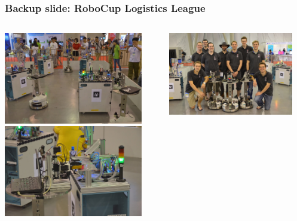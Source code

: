 \begin{frame}
  \frametitle{Backup slide: RoboCup Logistics League}
  \begin{columns}
  \begin{column}{0.5\textwidth}
  \center
  \includegraphics[width=0.9\textwidth]{images/DSC_6148}\\  
  \includegraphics[width=0.9\textwidth]{images/DSC_6497}  
  \end{column}
  \begin{column}{0.5\textwidth}
  \center
  \includegraphics[width=0.9\textwidth]{images/DSC_6846}\\

\end{column}
\end{columns}
\end{frame}
